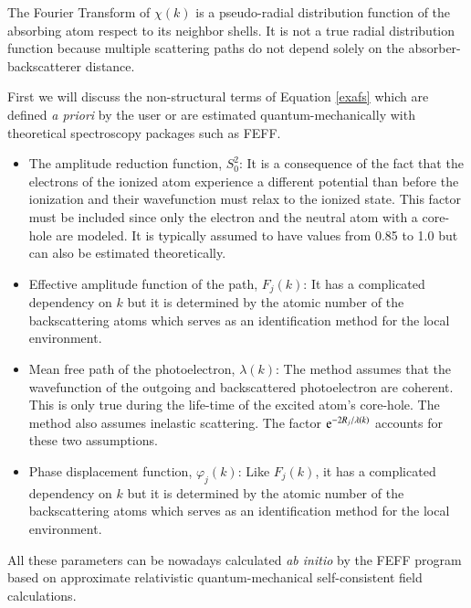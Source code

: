 The Fourier Transform of $\chi(k)$ is a pseudo-radial distribution function of the absorbing atom 
respect to its neighbor shells. It is not a true radial distribution function because multiple 
scattering paths do not depend solely on the absorber-backscatterer distance. 

First we will discuss the non-structural terms of Equation \ref{exafs} which are defined 
\textit{a priori} 
by the user or are estimated quantum-mechanically with  theoretical spectroscopy packages such 
as FEFF\cite{FEFF_PhysRevB_Rehr_2003,FEFF2_RevModPhys_Rehr_2000}.
\begin{itemize}
 \item The amplitude reduction function, $S_0^2$: It is a consequence of the 
fact that the electrons of the ionized atom experience a different potential than before the 
ionization and their wavefunction must relax to the ionized state. This factor must be included 
since only the electron and the neutral atom with a core-hole are modeled. It is typically assumed 
to have values from 0.85 to 1.0 but can also be estimated theoretically.
 \item Effective amplitude function of the path, $F_j(k)$: It has a complicated dependency on $k$ 
but it is determined by the atomic number of the backscattering atoms which serves as an
identification method for the local environment.
 \item Mean free path of the photoelectron, $\lambda(k)$: The method assumes that the wavefunction 
of 
the 
outgoing and backscattered photoelectron are coherent. This is only true during the life-time of 
the excited atom's core-hole. The method also assumes inelastic scattering. The factor $\mathrm{e}^{ 
-2R_j/\lambda(k)}$ accounts for these two assumptions.
 \item Phase displacement function, $\varphi_j(k)$: Like $F_j(k)$, it has a complicated dependency 
on 
$k$ but it is determined by the atomic number of the backscattering atoms which serves as an
identification method for the local environment.
\end{itemize}
All these parameters can be nowadays calculated \textit{ab initio} by the FEFF program based on 
approximate 
relativistic quantum-mechanical self-consistent field calculations.


